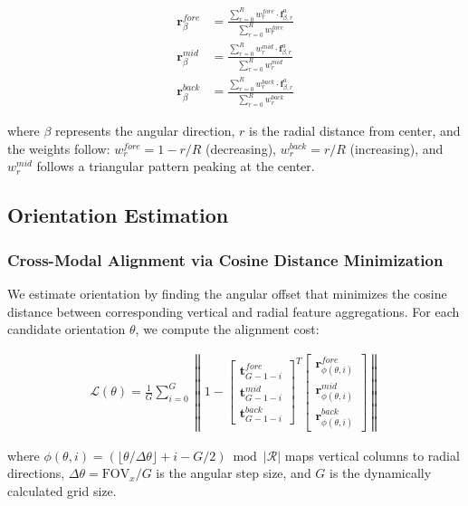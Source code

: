 \begin{align}
\mathbf{r}_\beta^{fore} &= \frac{\sum_{r=0}^{R} w_r^{fore} \cdot \mathbf{f}_{\beta,r}^a}{\sum_{r=0}^{R} w_r^{fore}} \\
\mathbf{r}_\beta^{mid} &= \frac{\sum_{r=0}^{R} w_r^{mid} \cdot \mathbf{f}_{\beta,r}^a}{\sum_{r=0}^{R} w_r^{mid}} \\
\mathbf{r}_\beta^{back} &= \frac{\sum_{r=0}^{R} w_r^{back} \cdot \mathbf{f}_{\beta,r}^a}{\sum_{r=0}^{R} w_r^{back}}
\end{align}

where $\beta$ represents the angular direction, $r$ is the radial distance from center, and the weights follow: $w_r^{fore} = 1-r/R$ (decreasing), $w_r^{back} = r/R$ (increasing), and $w_r^{mid}$ follows a triangular pattern peaking at the center.

\subsection{Orientation Estimation}

\subsubsection{Cross-Modal Alignment via Cosine Distance Minimization}

We estimate orientation by finding the angular offset that minimizes the cosine distance between corresponding vertical and radial feature aggregations. For each candidate orientation $\theta$, we compute the alignment cost:

\begin{align}
\mathcal{L}(\theta) = \frac{1}{G} \sum_{i=0}^{G} \left\| 1 - \begin{bmatrix} \mathbf{t}_{G-1-i}^{fore} \\ \mathbf{t}_{G-1-i}^{mid} \\ \mathbf{t}_{G-1-i}^{back} \end{bmatrix}^T \begin{bmatrix} \mathbf{r}_{\phi(\theta,i)}^{fore} \\ \mathbf{r}_{\phi(\theta,i)}^{mid} \\ \mathbf{r}_{\phi(\theta,i)}^{back} \end{bmatrix} \right\|
\end{align}

where $\phi(\theta,i) = (\lfloor\theta/\Delta\theta\rfloor + i - G/2) \bmod |\mathcal{R}|$ maps vertical columns to radial directions, $\Delta\theta = \text{FOV}_x / G$ is the angular step size, and $G$ is the dynamically calculated grid size.

